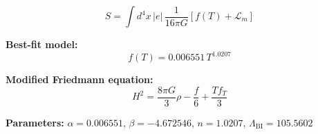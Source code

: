 
\begin{equation}
  S = \int d^4x \, |e| \, \frac{1}{16\pi G} \left[ f(T) + \mathcal{L}_m \right]
\end{equation}

\textbf{Best-fit model:}
\begin{equation}
  f(T) = 0.006551 \, T^{1.0207}
\end{equation}

\textbf{Modified Friedmann equation:}
\begin{equation}
  H^2 = \frac{8\pi G}{3} \rho - \frac{f}{6} + \frac{T f_T}{3}
\end{equation}

\textbf{Parameters:}
$\alpha = 0.006551$, \quad
$\beta = -4.672546$, \quad
$n = 1.0207$, \quad
$\Lambda_{\text{BI}} = 105.5602$